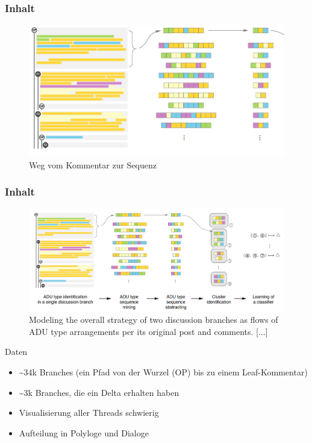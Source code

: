 \documentclass[compress,12pt]{beamer}
\begin{document}
    \begin{frame}[plain]
        \frametitle{Inhalt}
        \begin{figure}
            \centering
            \includegraphics[width=\textwidth]{../images/sequencing-part-1}
            \caption{Weg vom Kommentar zur Sequenz}
            \label{fig:comment-to-sequence}
        \end{figure}
    \end{frame}

    \begin{frame}
        \frametitle{Inhalt}
        \begin{figure}
            \centering
            \includegraphics[width=\textwidth]{../images/sequencing}
            \caption{Modeling the overall strategy of two discussion branches as flows of ADU type arrangements per its original post and comments. [...]}
            \label{fig:adu-sequencing}
        \end{figure}
    \end{frame}

    \begin{frame}{Daten}
        \begin{itemize}
            \item \textasciitilde 34k Branches (ein Pfad von der Wurzel (OP) bis zu einem Leaf-Kommentar)
            \item \textasciitilde 3k Branches, die ein Delta erhalten haben
            \item \textrightarrow{} Visualisierung aller Threads schwierig
            \item Aufteilung in Polyloge und Dialoge
        \end{itemize}
    \end{frame}
\end{document}
